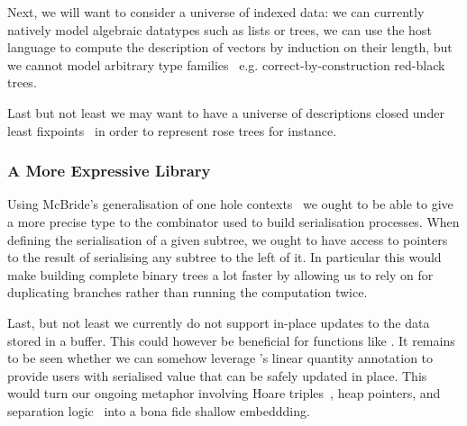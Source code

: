 Next, we will want to consider a universe of indexed data:
we can currently natively model algebraic datatypes such as lists or trees,
we can use the host language to compute the description of vectors by induction on their length,
but we cannot model arbitrary type families~\cite{DBLP:journals/fac/Dybjer94}
e.g. correct-by-construction red-black trees.

Last but not least we may want to have a universe of descriptions closed
under least fixpoints~\cite{DBLP:phd/ethos/Morris07}
in order to represent rose trees for instance.

\subsubsection{A More Expressive Library}

Using McBride's generalisation of one hole contexts~\cite{DBLP:conf/popl/McBride08}
we ought to be able to give a more precise type to the combinator
\IdrisFunction{(\#)} used to build serialisation processes.
%
When defining the serialisation of a given subtree, we ought to have access to
pointers to the result of serialising any subtree to the left of it. In particular
this would make building complete binary trees a lot faster by allowing us to rely
on  for duplicating branches rather than running the computation
twice.

Last, but not least we currently do not support in-place updates to
the data stored in a buffer.
This could however be beneficial for functions like .
%
It remains to be seen whether we can somehow leverage \idris{}'s
linear quantity annotation to provide users with serialised value that
can be safely updated in place.
%
This would turn our ongoing metaphor involving
Hoare triples~\cite{DBLP:journals/cacm/Hoare69},
heap pointers,
and separation logic~\cite{DBLP:conf/lics/Reynolds02}
into a bona fide shallow embeddding.
